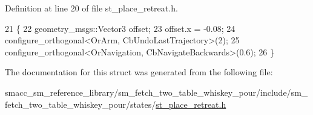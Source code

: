 Definition at line 20 of file st\+\_\+place\+\_\+retreat.\+h.


\begin{DoxyCode}
21         \{
22             geometry\_msgs::Vector3 offset;
23             offset.x = -0.08;
24             configure\_orthogonal<OrArm, CbUndoLastTrajectory>(2);
25             configure\_orthogonal<OrNavigation, CbNavigateBackwards>(0.6);
26         \}
\end{DoxyCode}


The documentation for this struct was generated from the following file\+:\begin{DoxyCompactItemize}
\item 
smacc\+\_\+sm\+\_\+reference\+\_\+library/sm\+\_\+fetch\+\_\+two\+\_\+table\+\_\+whiskey\+\_\+pour/include/sm\+\_\+fetch\+\_\+two\+\_\+table\+\_\+whiskey\+\_\+pour/states/\hyperlink{sm__fetch__two__table__whiskey__pour_2include_2sm__fetch__two__table__whiskey__pour_2states_2st__place__retreat_8h}{st\+\_\+place\+\_\+retreat.\+h}\end{DoxyCompactItemize}
